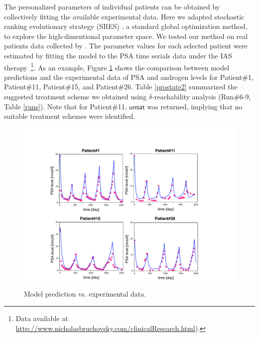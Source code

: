 The personalized parameters of individual patients can be obtained by collectively fitting the available experimental data. Here we adapted stochastic ranking evolutionary strategy (SRES) \cite{sres}, a standard global optimization method, to explore the high-dimentional parameter space. %
%
We tested our method on real patients data collected by \cite{bruchovsky07}. The parameter values for each selected patient were estimated by fitting the model to the PSA time serials data under the IAS therapy~\footnote{Data available at \url{http://www.nicholasbruchovsky.com/clinicalResearch.html}).}. As an example, Figure \ref{fitting} shows the comparison between model predictions and the experimental data of PSA and androgen levels for Patient\#1, Patient\#11, Patient\#15, and Patient\#26. Table \ref{prostate2} summarized the suggested treatment scheme we obtained using $\delta$-reachability analysis (Run\#6-9, Table \ref{runs}). Note that for Patient\#11, $\mathsf{unsat}$ was returned, implying that no suitable treatment schemes were identified.


\begin{figure}[htb]
\centering
\includegraphics[scale=0.48]{fig-fitting}
\caption{Model prediction vs. experimental data.}
\label{fitting}
\end{figure}







